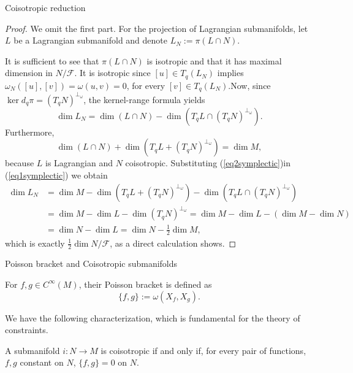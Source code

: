\begin{frame}{Coisotropic reduction}
    \begin{proof} We omit the first part. For the projection of Lagrangian submanifolds, let $L$ be a Lagrangian submanifold and denote $L_N := \pi(L \cap N).$\\
    \vspace{0.5cm}

It is
sufficient to see that $\pi(L \cap N)$ is isotropic and that it has maximal dimension in $N / \mathcal{F}$. \pause It is isotropic since $[u] \in
T_q(L _ N)$ implies $\omega_N([u],[v]) = \omega(u,v) = 0$, for every $[v] \in T_q(L _ N)$.\pause  Now, since $\ker d_q\pi =
(T_qN)^{\perp_\omega}$, the kernel-range formula yields \begin{equation}\label{eq1symplectic} \dim L_N = \dim(L \cap N) - \dim (T_q L \cap (T_qN)^{\perp_\omega}). \end{equation} 
Furthermore, \begin{equation}\label{eq2symplectic} \dim(L \cap N) + \dim (T_qL + (T_qN)^{\perp_\omega}) = \dim M,
\end{equation} because $L$ is Lagrangian and $N$ coisotropic. Substituting (\ref{eq2symplectic})in (\ref{eq1symplectic}) we obtain \begin{align} \nonumber
\dim L_N &= \dim M - \dim (T_qL + (T_qN)^{\perp_\omega})- \dim (T_q L \cap (T_qN )^{\perp_\omega}) \\ & \nonumber = \dim M - \dim L - \dim (T_qN)^{\perp_\omega} = \dim M - \dim L -(\dim M - \dim N)\\ &\nonumber = \dim N - \dim L = \dim N - \frac{1}{2} \dim
M, \end{align} which is exactly $\frac{1}{2} \dim N/ \mathcal{F}$, as a direct calculation shows.
    \end{proof}
\end{frame}

\begin{frame}{Poisson bracket and Coisotropic submanifolds}

\begin{definition} For $f, g \in C^\infty(M)$, their \alert{Poisson bracket} is defined as $$\{f,g\} := \omega(X_f, X_g).$$
\end{definition}

We have the following characterization, which is fundamental for the theory of constraints.

\begin{proposition}A submanifold $i: N \rightarrow M$ is coisotropic if and only if, for every pair of functions, $f,g$ constant on $N$, $\{f,g\} = 0$ on $N$.
\end{proposition}
\end{frame}

